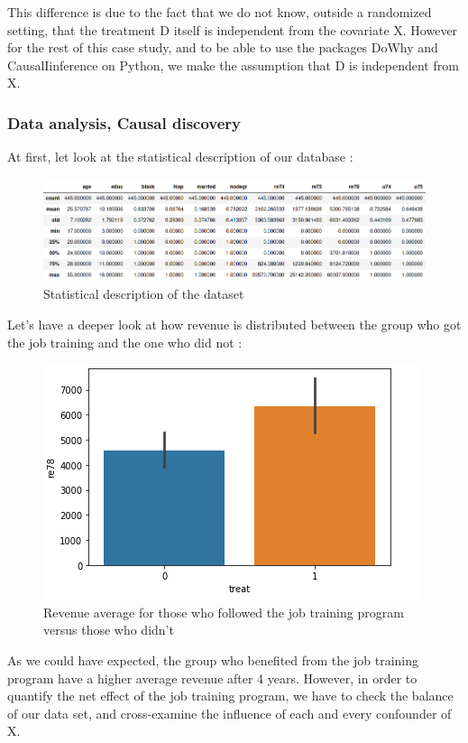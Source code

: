 \documentclass{article}
\begin{document}
This difference is due to the fact that we do not know, outside a randomized setting, that the treatment D itself is independent from the covariate X. 
However for the rest of this case study, and to be able to use the packages DoWhy and CausalIinference on Python, we make the assumption that D is independent from X.

\subsubsection{Data analysis, Causal discovery}

At first, let look at the statistical description of our database : 

\begin{figure}[h]
\centering
\includegraphics[width=1 \textwidth]{../figures/data_description.png}
\caption{Statistical description of the dataset}
\end{figure}


Let's have a deeper look at how revenue is distributed between the group who got the job training and the one who did not : 

\begin{figure}[h]
\small
\centering
\includegraphics[width=0.5 \textwidth]{../figures/treatment_average_2.png}
\caption{Revenue average for those who followed the job training program versus those who didn't}
\end{figure}


As we could have expected, the group who benefited from the job training program have a higher average revenue after 4 years. However, in order to quantify the net effect of the job training program, we have to check the balance of our data set, and cross-examine the influence of each and every confounder of X.
\end{document}
